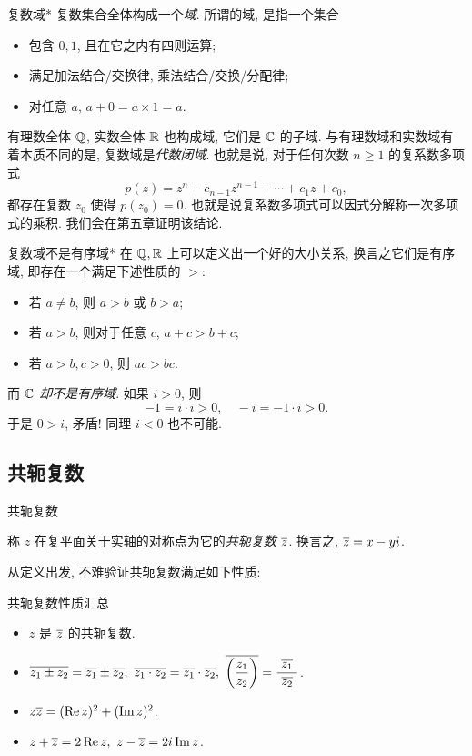 \begin{frame}{复数域*}
\onslide<+->复数集合全体构成一个\emph{域}.
\onslide<+->所谓的域, 是指一个集合
\begin{itemize}
\item 包含 $0,1$, 且在它之内有四则运算;
\item 满足加法结合/交换律, 乘法结合/交换/分配律;
\item 对任意 $a$, $a+0=a\times 1=a$.
\end{itemize}
\onslide<+->有理数全体 ${\mathbb{Q}}$, 实数全体 ${\mathbb{R}}$ 也构成域, 它们是 ${\mathbb{C}}$ 的子域.
\onslide<+->与有理数域和实数域有着本质不同的是, 复数域是\emph{代数闭域}.
\onslide<+->也就是说, 对于任何次数 $n\ge 1$ 的复系数多项式
	\[p(z)=z^n+c_{n-1}z^{n-1}+\cdots+c_1z+c_0,\]
\onslide<+->都存在复数 $z_0$ 使得 $p(z_0)=0$.
\onslide<+->也就是说复系数多项式可以因式分解称一次多项式的乘积.
\onslide<+->我们会在第五章证明该结论.
\end{frame}


\begin{frame}{复数域不是有序域*}
\onslide<+->在 ${\mathbb{Q}},{\mathbb{R}}$ 上可以定义出一个好的大小关系,
\onslide<+->换言之它们是有序域, 即存在一个满足下述性质的 $>$:
\begin{itemize}
\item 若 $a\neq b$, 则 $a>b$ 或 $b>a$;
\item 若 $a>b$, 则对于任意 $c$, $a+c>b+c$;
\item 若 $a>b,c>0$, 则 $ac>bc$.
\end{itemize}
\onslide<+->而 \emph{${\mathbb{C}}$ 却不是有序域}.
\onslide<+->如果 $i>0$, 则
	\[-1=i\cdot i>0,\quad -i=-1\cdot i>0.\]
\onslide<+->于是 $0>i$, 矛盾! 同理 $i<0$ 也不可能.
\end{frame}


\subsection{共轭复数}

\begin{frame}{共轭复数}
\onslide<+->
\begin{definition}
称 $z$ 在复平面关于实轴的对称点为它的\emph{共轭复数 $\overline z$}.
换言之, $\overline z=x-yi$.
\end{definition}
\onslide<+->从定义出发, 不难验证共轭复数满足如下性质:
\onslide<+->
\begin{block}{共轭复数性质汇总}
\begin{itemize}
\item $z$ 是 $\overline z$ 的共轭复数.
\item $\ov{z_1\pm z_2}=\ov{z_1}\pm\ov{z_2},\ 
\ov{z_1\cdot z_2}=\ov{z_1}\cdot\ov{z_2},\ 
\ov{\left(\dfrac{z_1}{z_2}\right)}=\dfrac{~\ov{z_1}~}{\ov{z_2}}$.
\item $z\overline{z}=(\operatorname{Re} z)^2+(\operatorname{Im} z)^2$.
\item $z+\overline z=2\operatorname{Re} z,\ z-\overline z=2i\operatorname{Im} z$.
\end{itemize}
\end{block}
\end{frame}


